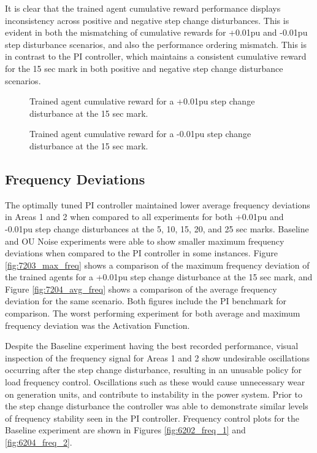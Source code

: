 It is clear that the trained agent cumulative reward performance displays inconsistency across positive and negative step change disturbances. This is evident in both the mismatching of cumulative rewards for +0.01pu and -0.01pu step disturbance scenarios, and also the performance ordering mismatch. This is in contrast to the PI controller, which maintains a consistent cumulative reward for the 15 sec mark in both positive and negative step change disturbance scenarios.
\begin{figure}[h]
	\begin{minipage}[t]{0.50\textwidth}
		\centering
		\resizebox{7cm}{!}{}
		\caption{Trained agent cumulative reward for a +0.01pu step change disturbance at the 15 sec mark.}\label{fig:7201_cum_reward_pos}
	\end{minipage}
	\hspace{0.25cm}
	\begin{minipage}[t]{0.50\textwidth}
		\resizebox{7cm}{!}{}
		\caption{Trained agent cumulative reward for a -0.01pu step change disturbance at the 15 sec mark.}\label{fig:7202_cum_reward_neg}
	\end{minipage}
\end{figure}

\subsection{Frequency Deviations}
The optimally tuned PI controller maintained lower average frequency deviations in Areas 1 and 2 when compared to all experiments for both +0.01pu and -0.01pu step change disturbances at the 5, 10, 15, 20, and 25 sec marks. Baseline and OU Noise experiments were able to show smaller maximum frequency deviations when compared to the PI controller in some instances. Figure \ref{fig:7203_max_freq} shows a comparison of the maximum frequency deviation of  the trained agents for a +0.01pu step change disturbance at the 15 sec mark, and Figure \ref{fig:7204_avg_freq} shows a comparison of the average frequency deviation for the same scenario. Both figures include the PI benchmark for comparison. The worst performing experiment for both average and maximum frequency deviation was the Activation Function.

Despite the Baseline experiment having the best recorded performance, visual inspection of the frequency signal for Areas 1 and 2 show undesirable oscillations occurring after the step change disturbance, resulting in an unusable policy for load frequency control. Oscillations such as these would cause unnecessary wear on generation units, and contribute to instability in the power system. Prior to the step change disturbance the controller was able to demonstrate similar levels of frequency stability seen in the PI controller. Frequency control plots for the Baseline experiment are shown in Figures \ref{fig:6202_freq_1} and \ref{fig:6204_freq_2}.

